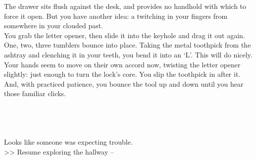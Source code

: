 The drawer sits flush against the desk, and provides no handhold with which to force it open. But you have another idea: a twitching in your fingers from somewhere in your clouded past.\\

You grab the letter opener, then slide it into the keyhole and drag it out again. One, two, three tumblers bounce into place. Taking the metal toothpick from the ashtray and clenching it in your teeth, you bend it into an ‘L’. This will do nicely.\\

Your hands seem to move on their own accord now, twisting the letter opener slightly: just enough to turn the lock's core. You slip the toothpick in after it. And, with practiced patience, you bounce the tool up and down until you hear those familiar clicks.\\
\\
\\
\\
\\

Looks like someone was expecting trouble.\\

>> Resume exploring the hallway -- 
